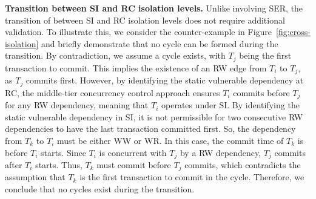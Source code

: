 \textbf{Transition between SI and RC isolation levels.} Unlike involving SER, the transition of \sysname between SI and RC isolation levels does not require additional validation. To illustrate this, we consider the counter-example in Figure~\ref{fig:cross-isolation} and briefly demonstrate that no cycle can be formed during the transition. By contradiction, we assume a cycle exists, with $T_j$ being the first transaction to commit. This implies the existence of an RW edge from $T_i$ to $T_j$, as $T_j$ commits first. However, by identifying the static vulnerable dependency at RC, the middle-tier concurrency control approach ensures $T_i$ commits before $T_j$ for any RW dependency, meaning that $T_i$ operates under SI. 
By identifying the static vulnerable dependency in SI, it is not permissible for two consecutive RW dependencies to have the last transaction committed first. So, the dependency from $T_k$ to $T_i$ must be either WW or WR. 
In this case, the commit time of $T_k$ is before $T_i$ starts. Since $T_i$ is concurrent with $T_j$ by a RW dependency, $T_j$ commits after $T_i$ starts. Thus, $T_k$ must commit before $T_j$ commits, which contradicts the assumption that $T_k$ is the first transaction to commit in the cycle. Therefore, we conclude that no cycles exist during the transition.



